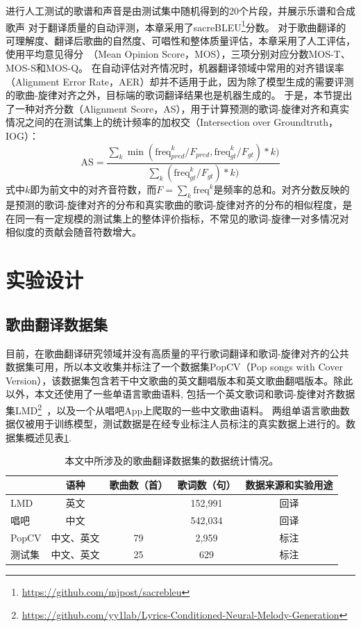 进行人工测试的歌谱和声音是由测试集中随机得到的20个片段，并展示乐谱和合成歌声
对于翻译质量的自动评测，本章采用了sacreBLEU\footnote{\url{https://github.com/mjpost/sacrebleu}}分数。
对于歌曲翻译的可理解度、翻译后歌曲的自然度、可唱性和整体质量评估，本章采用了人工评估，使用平均意见得分~（Mean Opinion Score，MOS），三项分别对应分数MOS-T、MOS-S和MOS-Q。
在自动评估对齐情况时，机器翻译领域中常用的对齐错误率（Alignment Error Rate，AER）却并不适用于此，因为除了模型生成的需要评测的歌曲-旋律对齐之外，目标端的歌词翻译结果也是机器生成的。
于是，本节提出了一种对齐分数（Alignment Score，AS），用于计算预测的歌词-旋律对齐和真实情况之间的在测试集上的统计频率的加权交（Intersection over Groundtruth，IOG）：
\begin{equation}
    \text{AS} = \frac{\sum_{k}\min(\text{freq}_{pred}^k/F_{pred}, \text{freq}_{gt}^k/F_{gt}) * k)}{\sum_{k} (\text{freq}_{gt}^k/F_{gt}) * k) }
\end{equation}
式中$k$即为前文中的对齐音符数，而$F = \sum_{k} \text{freq}^k$是频率的总和。对齐分数反映的是预测的歌词-旋律对齐的分布和真实歌曲的歌词-旋律对齐的分布的相似程度，是在同一有一定规模的测试集上的整体评价指标，不常见的歌词-旋律一对多情况对相似度的贡献会随音符数增大。
\section{实验设计}
\subsection{歌曲翻译数据集}
目前，在歌曲翻译研究领域并没有高质量的平行歌词翻译和歌词-旋律对齐的公共数据集可用，所以本文收集并标注了一个数据集PopCV（Pop songs with Cover Version），该数据集包含若干中文歌曲的英文翻唱版本和英文歌曲翻唱版本。除此以外，本文还使用了一些单语言歌曲语料, 包括一个英文歌词和歌词-旋律对齐数据集LMD\footnote{\url{https://github.com/yy1lab/Lyrics-Conditioned-Neural-Melody-Generation}}~\citep{LMD}，以及一个从唱吧App上爬取的一些中文歌曲语料。
两组单语言歌曲数据仅被用于训练模型，测试数据是在经专业标注人员标注的真实数据上进行的。数据集概述见表\ref{tab:dataset_stat}.
\begin{table}[htbp]
    \centering
    \setlength{\belowcaptionskip}{8pt} %
    \caption{本文中所涉及的歌曲翻译数据集的数据统计情况。}
    \begin{tabular}{|l|c|c|c|c|}
    \hline
         & 语种 & 歌曲数（首） & 歌词数（句） & 数据来源和实验用途\\
    \hline
     LMD & 英文 & \diagbox[]{}{} & 152,991 & 回译\\
    \hline
     唱吧 & 中文 & \diagbox[]{}{} & 542,034 & 回译\\
    \hline
     PopCV & 中文、英文 & 79 & 2,959 & 标注\\
    \hline
     测试集 & 中文、英文 & 25 & 629 & 标注\\
    \hline
    \end{tabular}
    \label{tab:dataset_stat}
\end{table}

